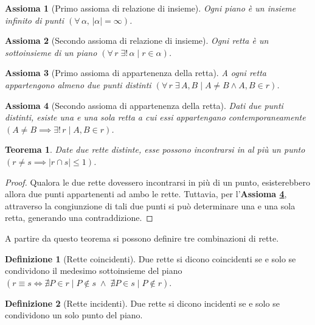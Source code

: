 \documentclass{article}
\newtheorem{axiom}{Assioma}[section]
\newtheorem{theorem}{Teorema}[section]
\theoremstyle{definition}
\newtheorem{definition}{Definizione}[section]
\begin{document}
\begin{axiom}[Primo assioma di relazione di insieme]
    Ogni piano è un insieme infinito di punti
    $( \forall \, \alpha, \, |\alpha| = \infty )$.
\end{axiom}

\begin{axiom}[Secondo assioma di relazione di insieme]
    Ogni retta è un sottoinsieme di un piano
    $(\forall \, r \; \exists! \, \alpha \mid r \in \alpha)$.
\end{axiom}

\begin{axiom}[Primo assioma di appartenenza della retta]
    A ogni retta appartengono almeno due punti distinti
    $(\forall \, r \; \exists \, A, B \mid A \neq B \land A, B \in r)$.
\end{axiom}

\begin{axiom}[Secondo assioma di appartenenza della retta]
    \label{retta:secondo_assioma_appartenenza}
    Dati due punti distinti, esiste una e una sola retta a cui
    essi appartengano contemporaneamente
    $(A \neq B \implies \exists! \, r \mid A, B \in r)$.
\end{axiom}

\begin{theorem}
    Date due rette distinte, esse possono incontrarsi
    in al più un punto
    $(r \neq s \implies |r \cap s| \leq 1)$.
\end{theorem}

\begin{proof}
    Qualora le due rette dovessero incontrarsi in più di un punto, esisterebbero
    allora due punti appartenenti ad
    ambo le rette. Tuttavia, per
    l'\textbf{Assioma \ref{retta:secondo_assioma_appartenenza}},
    attraverso la congiunzione di tali due punti
    si può determinare una e una sola retta,
    generando una contraddizione.
\end{proof}

A partire da questo teorema si possono definire tre combinazioni di rette.

\begin{definition}[Rette coincidenti]
    Due rette si dicono coincidenti se e solo se
    condividono il medesimo sottoinsieme del piano
    $(r \equiv s \iff \nexists P \in r \mid P \notin s \; \land \;
        \nexists P \in s \mid P \notin r)$.
\end{definition}

\begin{definition}[Rette incidenti]
    Due rette si dicono incidenti se e solo se
    condividono un solo punto del piano.
\end{definition}
\end{document}

